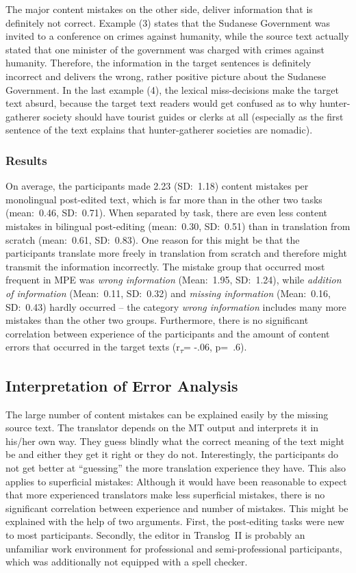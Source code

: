 \documentclass[output=paper]{langsci/langscibook}
\begin{document}
The major content mistakes on the other side, deliver information that is definitely not correct. Example (3) states that the Sudanese Government was invited to a conference on crimes against humanity, while the source text actually stated that one minister of the government was charged with crimes against humanity. Therefore, the information in the target sentences is definitely incorrect and delivers the wrong, rather positive picture about the Sudanese Government. In the last example (4), the lexical miss-decisions make the target text absurd, because the target text readers would get confused as to why hunter-gatherer society should have tourist guides or clerks at all (especially as the first sentence of the text explains that hunter-gatherer societies are nomadic).


\subsubsection{Results}

On average, the participants made 2.23 (SD:~1.18) content mistakes per monolingual post-edited text, which is far more than in the other two tasks (mean:~0.46, SD:~0.71). When separated by task, there are even less content mistakes in bilingual post-editing (mean:~0.30, SD:~0.51) than in translation from scratch (mean:~0.61, SD:~0.83). One reason for this might be that the participants translate more freely in translation from scratch and therefore might transmit the information incorrectly. The mistake group that occurred most frequent in MPE was \textit{wrong information} (Mean:~1.95, SD:~1.24), while \textit{addition of information} (Mean:~0.11, SD:~0.32) and \textit{missing information }(Mean:~0.16, SD:~0.43) hardly occurred – the category \textit{wrong information }includes many more mistakes than the other two groups. Furthermore, there is no significant correlation between experience of the participants and the amount of content errors that occurred in the target texts (r\textsubscript{$\tau $}= -.06, p=~.6).

\subsection{Interpretation of Error Analysis}

The large number of content mistakes can be explained easily by the missing source text. The translator depends on the MT output and interprets it in his/her own way. They guess blindly what the correct meaning of the text might be and either they get it right or they do not. Interestingly, the participants do not get better at “guessing” the more translation experience they have. This also applies to superficial mistakes: Although it would have been reasonable to expect that more experienced translators make less superficial mistakes, there is no significant correlation between experience and number of mistakes. This might be explained with the help of two arguments. First, the post-editing tasks were new to most participants. Secondly, the editor in Translog~II is probably an unfamiliar work environment for professional and semi-professional participants, which was additionally not equipped with a spell checker.
\end{document}
